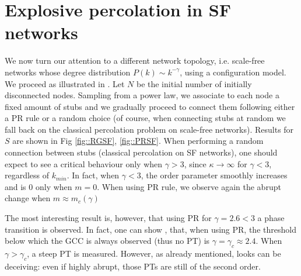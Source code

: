 \section{Explosive percolation in SF networks}
\label{par::SF}
We now turn our attention to a different network topology, i.e. scale-free networks whose degree distribution $P(k) \sim k^{-\gamma}$, using a configuration model. We proceed as illustrated in \cite{Radicchi}. Let $N$ be the initial number of initially disconnected nodes. Sampling from a power law, we associate to each node a fixed amount of stubs and we gradually proceed to connect them following either a PR rule or a random choice (of course, when connecting stubs at random we fall back on the classical percolation problem on scale-free networks). Results for $S$ are shown in Fig \ref{fig::RGSF}, \ref{fig::PRSF}. When performing a random connection between stubs (classical percolation on SF networks), one should expect to see a critical behaviour only when $\gamma > 3$, since $\kappa \to \infty$ for $\gamma < 3$, regardless of $k_{min}$. In fact, when $\gamma < 3$, the order parameter smoothly increases and is $0$ only when $m = 0$. When using PR rule, we observe again the abrupt change when $m \approx m_c(\gamma)$ 

The most interesting result is, however, that using PR for $\gamma = 2.6 < 3$ a phase transition is observed. In fact, one can show \cite{Radicchi}, \cite{Cho_2009} that, when using PR, the threshold below which the GCC is always observed (thus no PT) is $\gamma = \gamma_c \approx 2.4$. When $\gamma > \gamma_c$, a steep PT is measured. However, as already mentioned, looks can be deceiving: even if highly abrupt, those PTs are still of the second order. 

